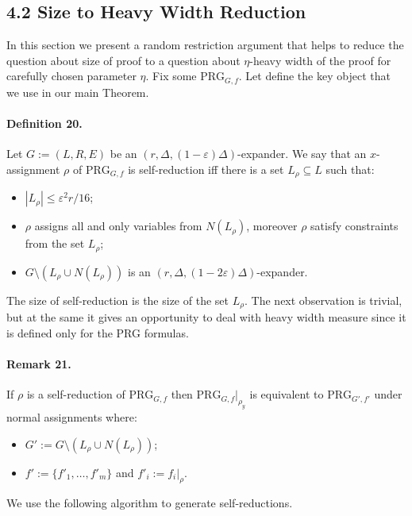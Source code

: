 \documentclass[10pt,a4paper]{article}
\begin{document}
\subsection*{4.2 Size to Heavy Width Reduction}
In this section we present a random restriction argument that helps to reduce the question about size of proof to a question about $\eta$-heavy width of the proof for carefully chosen parameter $\eta$. Fix some $\mathrm{PRG}_{G,f}$.
Let define the key object that we use in our main Theorem.
\paragraph{Definition 20.} Let $G:=(L,R,E)$ be an $(r,\Delta,(1-\varepsilon)\Delta)$-expander. We say that an $x$-assignment $\rho$ of $\mathrm{PRG}_{G,f}$ is self-reduction iff there is a set $L_\rho\subseteq L$ such that:
\begin{itemize}
\item $|L_\rho|\leq\varepsilon^2r/16$;
\item $\rho$ assigns all and only variables from $N(L_\rho)$, moreover $\rho$ satisfy constraints from the set $L_\rho$;
\item $G\setminus(L_\rho\cup N(L_\rho))$ is an $(r,\Delta,(1-2\varepsilon)\Delta)$-expander.
\end{itemize}
The size of self-reduction is the size of the set $L_\rho$.
The next observation is trivial, but at the same it gives an opportunity to deal with heavy width measure since it is defined only for the PRG formulas.
\paragraph{Remark 21.} If $\rho$ is a self-reduction of $\mathrm{PRG}_{G,f}$ then $\mathrm{PRG}_{G,f}|_{\rho_y}$ is equivalent to $\mathrm{PRG}_{G',f'}$ under normal assignments where:
\begin{itemize}
\item $G':=G\setminus(L_\rho\cup N(L_\rho))$;
\item $f':=\{f'_1,\ldots,f'_m\}$ and $f'_i:=f_i|_\rho$.
\end{itemize}
We use the following algorithm to generate self-reductions.
\end{document}
